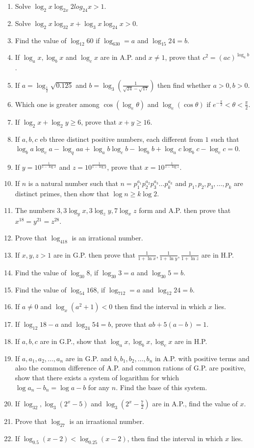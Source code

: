 \begin{enumerate}[resume]
\item Solve $\log_2x\log_{2x}2log_24x > 1$.
\item Solve $\log_2x\log_32x + \log_3x\log_24x > 0$.
\item Find the value of $\log_{12}60$ if $\log_630 = a$ and $\log_{15}24 = b$.
\item If $\log_ax, \log_bx$ and $\log_cx$ are in A.P. and $x\neq 1$, prove that $c^2 = (ac)^{\log_ab}$.
\item If $a = \log_{\tfrac{1}{2}}\sqrt{0.125}$ and $b = \log_3\left(\frac{1}{\sqrt{24} - \sqrt{17}}\right)$ then find whether $a >0,
  b> 0$.
\item Which one is greater among $\cos(\log_e\theta)$ and $\log_e(\cos\theta)$ if $e^{-\tfrac{\pi}{2}} < \theta < \frac{\pi}{2}$.
\item If $\log_2x + \log_2y \geq 6$, prove that $x + y\geq 16$.
\item If $a,b,c$ eb three distinct positive numbers, each different from $1$ such that $\log_ba\log_ca - \log_qaa + \log_ab\log_cb
  - \log_bb + \log_ac\log_bc - \log_cc = 0$.
\item If $y = 10^{\tfrac{1}{1 - \log x}}$ and $z = 10^{\tfrac{1}{1 - \log y}}$, prove that $x = 10^{\tfrac{1}{1 - \log z}}$.
\item If $n$ is a natural number such that $n = p_1^{a_1}p_2^{a_2}p_3^{a_3}\ldots p_k^{a_k}$ and $p_1, p_2, p_3, \ldots, p_k$ are
  distinct primes, then show that $\log n\geq k\log 2$.
\item The numbers $3, 3\log_yx, 3\log_zy, 7\log_xz$ form and A.P. then prove that $x^{18} = y^{21} = z^{28}$.
\item Prove that $\log_418$ is an irrational number.
\item If $x, y, z> 1$ are in G.P. then prove that $\frac{1}{1+ \ln x}, \frac{1}{1 + \ln y}, \frac{1}{1 + \ln z}$ are in H.P.
\item Find the value of $\log_{30}8$, if $\log_{30}3 = a$ and $\log_{30}5 = b$.
\item Find the value of $\log_{54}168$, if $\log_712 = a$ and $\log_{12}24 = b$.
\item If $a\neq 0$ and $\log_x(a^2 + 1) < 0$ then find the interval in which $x$ lies.
\item If $\log_{12}18 - a$ and $\log_{24}54=b$, prove that $ab + 5(a - b) = 1$.
\item If $a,b,c$ are in G.P., show that $\log_ax, \log_bx, \log_cx$ are in H.P.
\item If $a, a_1, a_2, \ldots, a_n$ are in G.P. and $b, b_1, b_2, \ldots, b_n$ in A.P. with positive terms and also the common
  difference of A.P. and common rations of G.P. are positive, show that there exists a system of logarithm for which $\log a_n -
  b_n = \log a - b$ for any $n$. Find the base of this system.
\item If $\log_32, \log_3(2^x - 5)$ and $\log_3\left(2^x - \frac{7}{2}\right)$ are in A.P., find the value of $x$.
\item Prove that $\log_27$ is an irraational number.
\item If $\log_{0.5}(x - 2) < \log_{0.25}(x - 2)$, then find the interval in which $x$ lies.
\end{enumerate}
